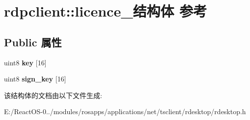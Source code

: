 \hypertarget{structrdpclient_1_1licence__}{}\section{rdpclient\+:\+:licence\+\_\+结构体 参考}
\label{structrdpclient_1_1licence__}
\subsection*{Public 属性}
\begin{DoxyCompactItemize}
\item 
\mbox{\label{structrdpclient_1_1licence___a9c712067fd55ed8965d771c8143e102e}} 
uint8 {\bfseries key} \mbox{[}16\mbox{]}
\item 
\mbox{\label{structrdpclient_1_1licence___af3a9e8a068cea276c686748ad30e3e9f}} 
uint8 {\bfseries sign\+\_\+key} \mbox{[}16\mbox{]}
\end{DoxyCompactItemize}


该结构体的文档由以下文件生成\+:\begin{DoxyCompactItemize}
\item 
E\+:/\+React\+O\+S-\/0../modules/rosapps/applications/net/tsclient/rdesktop/rdesktop.\+h\end{DoxyCompactItemize}
